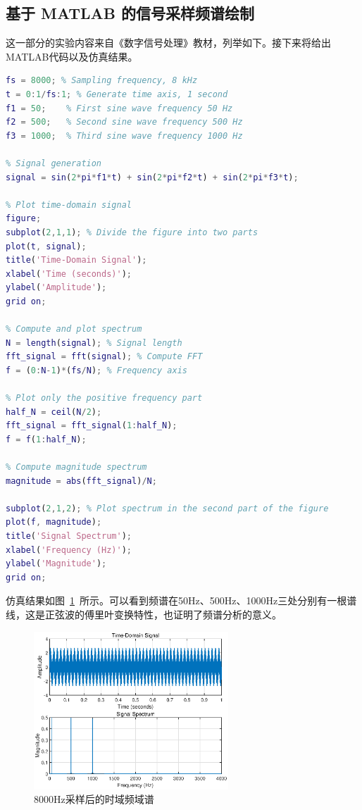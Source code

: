 \documentclass[lang=cn,newtx,10pt,scheme=chinese]{elegantbook}
\begin{document}
\subsection{基于 MATLAB 的信号采样频谱绘制}
这一部分的实验内容来自《数字信号处理》教材，列举如下。接下来将给出MATLAB代码以及仿真结果。

\begin{example}
  \begin{lstlisting}[language=matlab]
fs = 8000; % Sampling frequency, 8 kHz
t = 0:1/fs:1; % Generate time axis, 1 second
f1 = 50;    % First sine wave frequency 50 Hz
f2 = 500;   % Second sine wave frequency 500 Hz
f3 = 1000;  % Third sine wave frequency 1000 Hz

% Signal generation
signal = sin(2*pi*f1*t) + sin(2*pi*f2*t) + sin(2*pi*f3*t);

% Plot time-domain signal
figure;
subplot(2,1,1); % Divide the figure into two parts
plot(t, signal);
title('Time-Domain Signal');
xlabel('Time (seconds)');
ylabel('Amplitude');
grid on;

% Compute and plot spectrum
N = length(signal); % Signal length
fft_signal = fft(signal); % Compute FFT
f = (0:N-1)*(fs/N); % Frequency axis

% Plot only the positive frequency part
half_N = ceil(N/2);
fft_signal = fft_signal(1:half_N);
f = f(1:half_N);

% Compute magnitude spectrum
magnitude = abs(fft_signal)/N;

subplot(2,1,2); % Plot spectrum in the second part of the figure
plot(f, magnitude);
title('Signal Spectrum');
xlabel('Frequency (Hz)');
ylabel('Magnitude');
grid on;

  \end{lstlisting}
\end{example}
仿真结果如图~\ref{fig:fig1}~所示。可以看到频谱在50Hz、500Hz、1000Hz三处分别有一根谱线，这是正弦波的傅里叶变换特性，也证明了频谱分析的意义。
\begin{figure}[htbp]
  \centering
  \includegraphics[width=0.65\textwidth]{figure/fig1.eps}
  \caption{8000Hz采样后的时域频域谱}
  \label{fig:fig1}
\end{figure}
\end{document}
